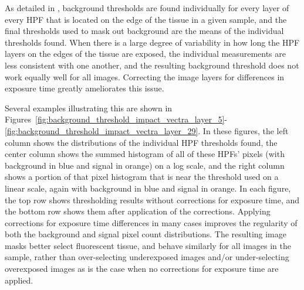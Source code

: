 \documentclass[letterpaper,11pt]{article}
\begin{document}
As detailed in \cite{flatfielding_note}, background thresholds are found individually for every layer of every HPF that is located on the edge of the tissue in a given sample, and the final thresholds used to mask out background are the means of the individual thresholds found. When there is a large degree of variability in how long the HPF layers on the edges of the tissue are exposed, the individual measurements are less consistent with one another, and the resulting background threshold does not work equally well for all images. Correcting the image layers for differences in exposure time greatly ameliorates this issue.

Several examples illustrating this are shown in Figures~\ref{fig:background_threshold_impact_vectra_layer_5}-\ref{fig:background_threshold_impact_vectra_layer_29}. In these figures, the left column shows the distributions of the individual HPF thresholds found, the center column shows the summed histogram of all of these HPFs' pixels (with background in blue and signal in orange) on a log scale, and the right column shows a portion of that pixel histogram that is near the threshold used on a linear scale, again with background in blue and signal in orange. In each figure, the top row shows thresholding results without corrections for exposure time, and the bottom row shows them after application of the corrections. Applying corrections for exposure time differences in many cases improves the regularity of both the background and signal pixel count distributions. The resulting image masks better select fluorescent tissue, and behave similarly for all images in the sample, rather than over-selecting underexposed images and/or under-selecting overexposed images as is the case when no corrections for exposure time are applied.
\end{document}
